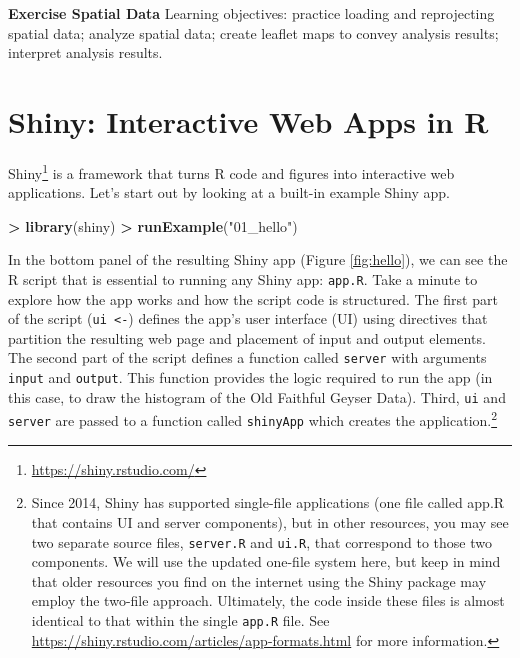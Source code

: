 \documentclass[
]{krantz}
\makeatletter
\newenvironment{Shaded}{\begin{snugshade}}{\end{snugshade}}
\newcommand{\KeywordTok}[1]{\textcolor[rgb]{0.27,0.27,0.27}{\textbf{#1}}}
\newcommand{\NormalTok}[1]{#1}
\newcommand{\OperatorTok}[1]{\textcolor[rgb]{0.43,0.43,0.43}{\textbf{#1}}}
\newcommand{\StringTok}[1]{\textcolor[rgb]{0.5,0.5,0.5}{#1}}
\renewcommand{\href}[2]{#2\footnote{\url{#1}}}
\newenvironment{kframe}{%
\medskip{}
\setlength{\fboxsep}{.8em}
 \def\at@end@of@kframe{}%
 \ifinner\ifhmode%
  \def\at@end@of@kframe{\end{minipage}}%
  \begin{minipage}{\columnwidth}%
 \fi\fi%
 \def\FrameCommand##1{\hskip\@totalleftmargin \hskip-\fboxsep
 \colorbox{shadecolor}{##1}\hskip-\fboxsep
     \hskip-\linewidth \hskip-\@totalleftmargin \hskip\columnwidth}%
 \MakeFramed {\advance\hsize-\width
   \@totalleftmargin\z@ \linewidth\hsize
   \@setminipage}}%
 {\par\unskip\endMakeFramed%
 \at@end@of@kframe}
\renewenvironment{Shaded}{\begin{kframe}}{\end{kframe}}
\makeatother
\begin{document}
\textbf{Exercise Spatial Data} Learning objectives: practice loading and reprojecting spatial data; analyze spatial data; create leaflet maps to convey analysis results; interpret analysis results.

\hypertarget{shiny-interactive-web-apps-in-r}{%
\chapter{Shiny: Interactive Web Apps in R}\label{shiny-interactive-web-apps-in-r}}

\href{https://shiny.rstudio.com/}{Shiny} is a framework that turns R code and figures into interactive web applications. Let's start out by looking at a built-in example Shiny app.

\begin{Shaded}
\begin{Highlighting}[]
\OperatorTok{\textgreater{}}\StringTok{ }\KeywordTok{library}\NormalTok{(shiny)}
\OperatorTok{\textgreater{}}\StringTok{ }\KeywordTok{runExample}\NormalTok{(}\StringTok{"01\_hello"}\NormalTok{)}
\end{Highlighting}
\end{Shaded}

In the bottom panel of the resulting Shiny app (Figure \ref{fig:hello}), we can see the R script that is essential to running any Shiny app: \texttt{app.R}. Take a minute to explore how the app works and how the script code is structured. The first part of the script (\texttt{ui\ \textless{}-}) defines the app's user interface (UI) using directives that partition the resulting web page and placement of input and output elements. The second part of the script defines a function called \texttt{server} with arguments \texttt{input} and \texttt{output}. This function provides the logic required to run the app (in this case, to draw the histogram of the Old Faithful Geyser Data). Third, \texttt{ui} and \texttt{server} are passed to a function called \texttt{shinyApp} which creates the application.\footnote{Since 2014, Shiny has supported single-file applications (one file called app.R that contains UI and server components), but in other resources, you may see two separate source files, \texttt{server.R} and \texttt{ui.R}, that correspond to those two components. We will use the updated one-file system here, but keep in mind that older resources you find on the internet using the Shiny package may employ the two-file approach. Ultimately, the code inside these files is almost identical to that within the single \texttt{app.R} file. See \url{https://shiny.rstudio.com/articles/app-formats.html} for more information.}
\end{document}

